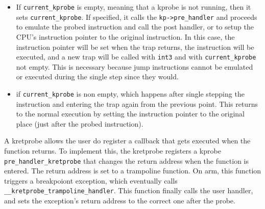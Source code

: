 \begin{itemize}

  \item If \verb|current_kprobe| is empty, meaning that a kprobe is not running,
    then it sets \verb|current_kprobe|. If specified, it calls the
    \verb|kp->pre_handler| and proceeds to emulate the probed instruction and
    call the post handler, or to setup the CPU's instruction pointer to the
    original instruction. In this case, the instruction pointer will be set when
    the trap returns, the instruction will be executed, and a new trap will be
    called with \verb|int3| and with \verb|current_kprobe| not empty. This is
    necessary because jump instructions cannot be emulated or executed during
    the single step since they would.

  \item if \verb|current_kprobe| is non empty, which happens after single
    stepping the instruction and entering the trap again from the previous
    point. This returns to the normal execution by setting the instruction
    pointer to the original place (just after the probed instruction).

\end{itemize}

A kretprobe allows the user do register a callback that gets executed when the
function returns. To implement this, the kretprobe registers a kprobe
\verb|pre_handler_kretprobe| that changes the return address when the function
is entered. The return address is set to a trampoline function. On arm, this
function triggers a breakpoiont exception, which eventually calls
\verb|__kretprobe_trampoline_handler|. This function finally calls the user
handler, and sets the exception's return address to the correct one after the
probe.




